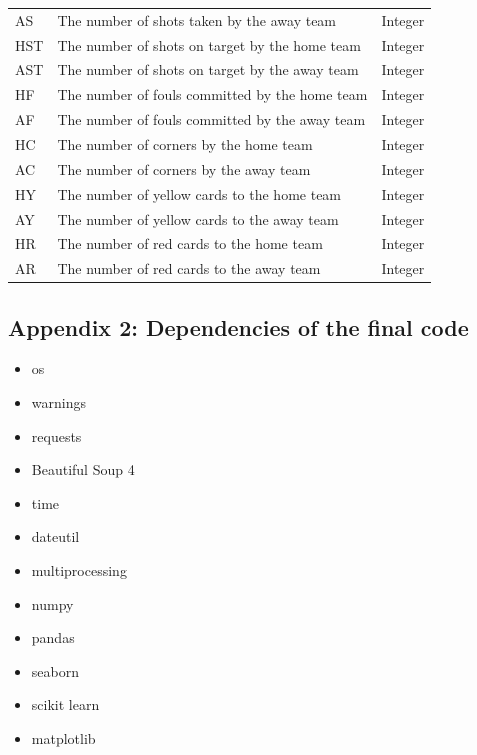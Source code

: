 \documentclass[a4paper,12pt]{article}
\begin{document}
\begin{table}[H]
\begin{tabular}{@{}lll@{}}
			AS       & The number of shots taken by the away team     & Integer                                                                  \\
			HST      & The number of shots on target by the home team & Integer                                                                  \\
			AST      & The number of shots on target by the away team & Integer                                                                  \\
			HF       & The number of fouls committed by the home team & Integer                                                                  \\
			AF       & The number of fouls committed by the away team & Integer                                                                  \\
			HC       & The number of corners by the home team         & Integer                                                                  \\
			AC       & The number of corners by the away team         & Integer                                                                  \\
			HY       & The number of yellow cards to the home team    & Integer                                                                  \\
			AY       & The number of yellow cards to the away team    & Integer                                                                  \\
			HR       & The number of red cards to the home team       & Integer                                                                  \\
			AR       & The number of red cards to the away team       & Integer                                                                  \\ \bottomrule
		\end{tabular}
	\end{table}

	\subsection*{Appendix 2: Dependencies of the final code}
	
	\begin{itemize}
		\item os
		\item warnings
		\item requests
		\item Beautiful Soup 4
		\item time
		\item dateutil
		\item multiprocessing
		\item numpy
		\item pandas
		\item seaborn
		\item scikit learn
		\item matplotlib
	\end{itemize}
	
\end{document}
